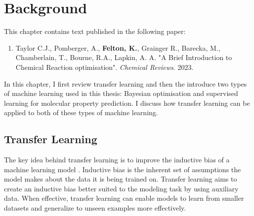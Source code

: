 \chapter{Background}\label{ch:background}

This chapter contains text published in the following paper:

\begin{enumerate}
\item Taylor C.J., Pomberger, A., \textbf{Felton, K.}, Grainger R., Barecka, M., Chamberlain, T., Bourne, R.A., Lapkin, A. A. "A Brief Introduction to Chemical Reaction optimisation". \textit{Chemical Reviews}. 2023.
\end{enumerate}

In this chapter, I first review transfer learning and then the introduce two types of machine learning used in this thesis: Bayesian optimisation and supervised learning for molecular property prediction. I discuss how transfer learning can be applied to both of these types of machine learning.

\section{Transfer Learning}

The key idea behind transfer learning is to improve the inductive bias of a machine learning model \cite{Zhuang2021}. Inductive bias is the inherent set of assumptions the model makes about the data it is being trained on. Transfer learning aims to create an inductive bias better suited to the modeling task by using auxiliary data. When effective, transfer learning can enable models to learn from smaller datasets and generalize to unseen examples more effectively. 

